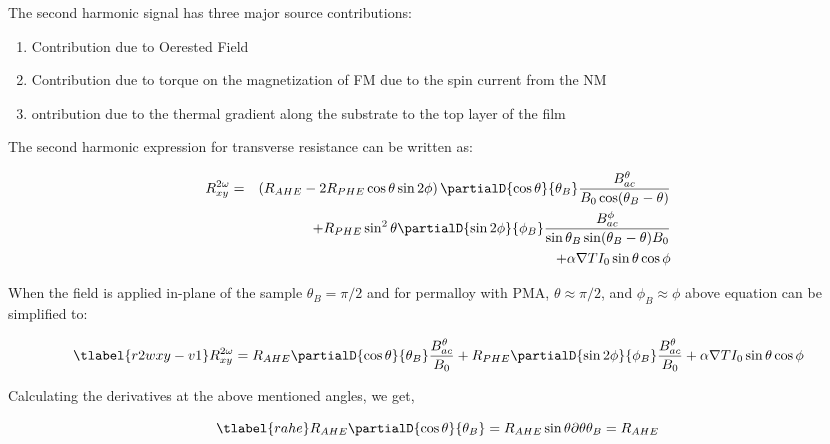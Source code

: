 The second harmonic signal has three major source contributions:

\begin{enumerate}
    \item Contribution due to Oerested Field
    \item Contribution due to torque on  the magnetization of FM due to the spin current 
    from the NM
    \item ontribution due to the thermal gradient along the substrate to the top layer of
     the film
\end{enumerate}

The second harmonic expression for transverse resistance can be written as:

\begin{eqnarray} \nonumber
        R^{2 \omega}_{xy}  &=& \left( R_{AHE} - 2 R_{PHE} \cos{\theta} \sin{2 \phi} \right)
        \partialD{\cos{\theta}}{\theta_{B}} \frac{B^{\theta}_{ac}}{B_{0} \cos ({\theta_{B} - \theta})} \\
        && \nonumber + R_{PHE} \sin ^{2} {\theta} \partialD{\sin {2\phi}}{\phi_{B}} 
        \frac{B^{\phi}_{ac}}{\sin {\theta_{B}}  \sin ({\theta_{B} - \theta}) B_{0}} \\
        && + \alpha \nabla {T} I_{0} \sin{\theta}\cos{\phi}
\end{eqnarray}

When the field is applied in-plane of the sample $\theta_{B}=\pi/2$ and for permalloy with PMA, 
$\theta \approx \pi/2$, and $\phi_{B} \approx \phi$  above equation can be simplified to:


\begin{equation}
    \tlabel{r2wxy-v1}
    R^{2 \omega}_{xy}  = R_{AHE} \partialD{\cos{\theta}}
    {\theta_B} \frac{B^{\theta}_{ac}}{B_{0}} + R_{PHE} 
    \partialD{\sin{2\phi}}{\phi_B} \frac{B^{\theta}_{ac}}{B_{0}}  + 
    \alpha \nabla {T} I_{0} \sin{\theta} \cos{\phi}
\end{equation}

Calculating the derivatives at the above mentioned angles, we get,

\begin{equation}
    \tlabel{rahe}
    R_{AHE} \partialD{\cos{\theta}} {\theta_B} = R_{AHE} \sin{\theta} \partial{\theta}{\theta_{B}} = R_{AHE} \\
    \end{equation}


